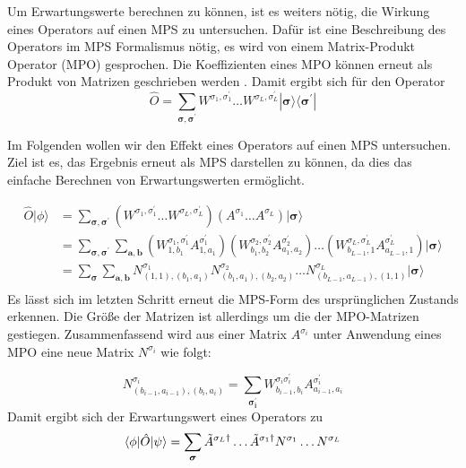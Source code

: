 \documentclass[10pt,a4paper]{report}
\begin{document}
Um Erwartungswerte berechnen zu können, ist es weiters nötig, die Wirkung eines Operators auf einen MPS zu untersuchen. Dafür ist eine Beschreibung des Operators im MPS Formalismus nötig, es wird von einem Matrix-Produkt Operator (MPO) gesprochen. Die Koeffizienten eines MPO können erneut als Produkt von Matrizen geschrieben werden . Damit ergibt sich für den Operator
\begin{equation}
\hat{O}=\sum_{\bm{\sigma},\bm{\sigma^\prime}}W^{\sigma_1,\sigma_1^\prime}\ldots W^{\sigma_L,\sigma_L^\prime} |\bm{\sigma}\rangle\langle\bm{\sigma^\prime}|
\end{equation}

Im Folgenden wollen wir den Effekt eines Operators auf einen MPS untersuchen. Ziel ist es, das Ergebnis erneut als MPS darstellen zu können, da dies das einfache Berechnen von Erwartungswerten ermöglicht.

\begin{equation}\label{MPO_MPS_equ}
\begin{split}
\hat{O}|\phi\rangle & = \sum_{\bm{\sigma},\bm{\sigma^\prime}}(W^{\sigma_1,\sigma_1^\prime}\ldots W^{\sigma_L,\sigma_L^\prime})(A^{\sigma_1}\ldots A^{\sigma_L})|\bm{\sigma}\rangle \\
& =\sum_{\bm{\sigma},\bm{\sigma^\prime}}\sum_{\bm{a},\bm{b}}(W_{1,b_1}^{\sigma_1,\sigma_1^\prime}A_{1,a_1}^{\sigma_1^\prime})(W_{b_1,b_2}^{\sigma_2,\sigma_2^\prime}A_{a_1,a_2}^{\sigma_2^\prime})\ldots(W_{b_{L-1},1}^{\sigma_L,\sigma_L^\prime}A_{a_{L-1},1}^{\sigma_L^\prime})|\bm{\sigma}\rangle \\
&=\sum_{\bm{\sigma}}\sum_{\bm{a},\bm{b}}N_{(1,1),(b_1,a_1)}^{\sigma_1}N_{(b_1,a_1),(b_2,a_2)}^{\sigma_2}\ldots N_{(b_{L-1},a_{L-1}),(1,1)}^{\sigma_L}|\bm{\sigma}\rangle \\
\end{split}
\end{equation}
Es lässt sich im letzten Schritt erneut die MPS-Form des ursprünglichen Zustands erkennen. Die Größe der Matrizen ist allerdings um die der MPO-Matrizen gestiegen. Zusammenfassend wird aus einer Matrix $A^{\sigma_i}$ unter Anwendung eines MPO eine neue Matrix $N^{\sigma_i}$ wie folgt:

\begin{equation}
N_{(b_{i-1},a_{i-1}),(b_i,a_i)}^{\sigma_i}=\sum_{\bm{\sigma_i^\prime}}W_{b_{i-1},b_i}^{\sigma_i\sigma_i^\prime}A_{a_{i-1},a_i}^{\sigma_i^\prime}
\end{equation}
Damit ergibt sich der Erwartungswert eines Operators zu
\begin{equation}
\langle\phi|\hat{O}|\psi\rangle=\sum_{\bm{\sigma}}\tilde{A}^{\sigma_L \dagger}\ldots\tilde{A}^{\sigma_1 \dagger} N^{\sigma_1}\ldots N^{\sigma_L}\\
\end{equation}
\end{document}
